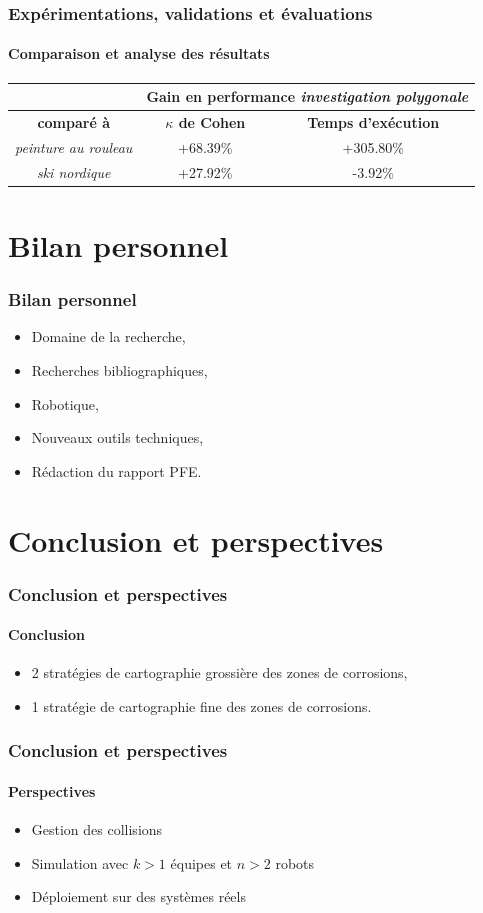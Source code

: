 \documentclass{beamer}
\begin{document}
			\begin{frame}
				\frametitle{Expérimentations, validations et évaluations}
				\framesubtitle{Comparaison et analyse des résultats}
				\begin{table}[H]
					\centering
					\begin{tabular}{|c|c|c|}
						\hline
						& \multicolumn{2}{c|}{\textbf{Gain en performance \textit{investigation polygonale}}} \\
						\hline
						\textbf{comparé à} & \textbf{$\kappa$ de Cohen} & \textbf{Temps d'exécution} \\
						\hline
						\textit{peinture au rouleau} & +68.39\% & +305.80\% \\
						\hline
						\textit{ski nordique} & +27.92\% & -3.92\% \\
						\hline
					\end{tabular}
				\end{table}
			\end{frame}
	\section{Bilan personnel}
		\begin{frame}
			\frametitle{Bilan personnel}
			\begin{itemize}
				\item Domaine de la recherche,
				\item Recherches bibliographiques,
				\item Robotique,
				\item Nouveaux outils techniques,
				\item Rédaction du rapport PFE.
			\end{itemize}
		\end{frame}
	\section{Conclusion et perspectives}
		\begin{frame}
			\frametitle{Conclusion et perspectives}
			\framesubtitle{Conclusion}
			\begin{itemize}
				\item 2 stratégies de cartographie grossière des zones de corrosions,
				\item 1 stratégie de cartographie fine des zones de corrosions.
			\end{itemize}
		\end{frame}
		\begin{frame}
			\frametitle{Conclusion et perspectives}
			\framesubtitle{Perspectives}
			\begin{itemize}
				\item Gestion des collisions
				\item Simulation avec $k > 1$ équipes et $n > 2$ robots
				\item Déploiement sur des systèmes réels
			\end{itemize}
		\end{frame}
\end{document}
